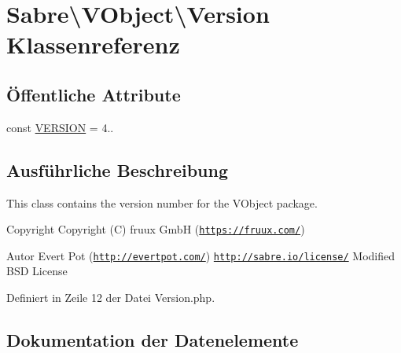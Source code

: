 \hypertarget{class_sabre_1_1_v_object_1_1_version}{}\section{Sabre\textbackslash{}V\+Object\textbackslash{}Version Klassenreferenz}
\label{class_sabre_1_1_v_object_1_1_version}
\subsection*{Öffentliche Attribute}
\begin{DoxyCompactItemize}
\item 
const \mbox{\hyperlink{class_sabre_1_1_v_object_1_1_version_a6cd5042277071bca62177477954673bb}{V\+E\+R\+S\+I\+ON}} = \textquotesingle{}4..\textquotesingle{}
\end{DoxyCompactItemize}


\subsection{Ausführliche Beschreibung}
This class contains the version number for the V\+Object package.

\begin{DoxyCopyright}{Copyright}
Copyright (C) fruux GmbH (\href{https://fruux.com/}{\tt https\+://fruux.\+com/}) 
\end{DoxyCopyright}
\begin{DoxyAuthor}{Autor}
Evert Pot (\href{http://evertpot.com/}{\tt http\+://evertpot.\+com/})  \href{http://sabre.io/license/}{\tt http\+://sabre.\+io/license/} Modified B\+SD License 
\end{DoxyAuthor}


Definiert in Zeile 12 der Datei Version.\+php.



\subsection{Dokumentation der Datenelemente}
\mbox{\label{class_sabre_1_1_v_object_1_1_version_a6cd5042277071bca62177477954673bb}} 

